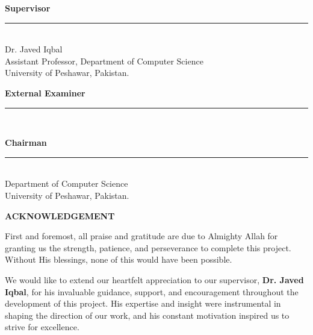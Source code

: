 \documentclass[12pt,a4paper]{report}
\begin{document}
\vspace{1.4cm}

\noindent \textbf{Supervisor}

\vspace{0.8cm}

\noindent \rule{10cm}{0.5pt} \\[0.7cm]
\noindent Dr. Javed Iqbal \\
Assistant Professor, Department of Computer Science \\
University of Peshawar, Pakistan.

\vspace{1cm}

\noindent \textbf{External Examiner}

\vspace{0.8cm}

\noindent  \rule{10cm}{0.5pt} \\[0.7cm]

\vspace{0.8cm}

\noindent \textbf{Chairman}

\vspace{0.8cm}

\noindent  \rule{10cm}{0.5pt} \\[0.7cm]
\noindent Department of Computer Science \\
University of Peshawar, Pakistan.

\vfill



\newpage

\newpage
\thispagestyle{plain}
\vspace*{2cm}

\begin{center}
    {\Large\bfseries ACKNOWLEDGEMENT}
\end{center}

\vspace{1cm}

First and foremost, all praise and gratitude are due to Almighty Allah for granting us the strength, patience, and perseverance to complete this project. Without His blessings, none of this would have been possible.

We would like to extend our heartfelt appreciation to our supervisor, \textbf{Dr. Javed Iqbal}, for his invaluable guidance, support, and encouragement throughout the development of this project. His expertise and insight were instrumental in shaping the direction of our work, and his constant motivation inspired us to strive for excellence.
\end{document}
